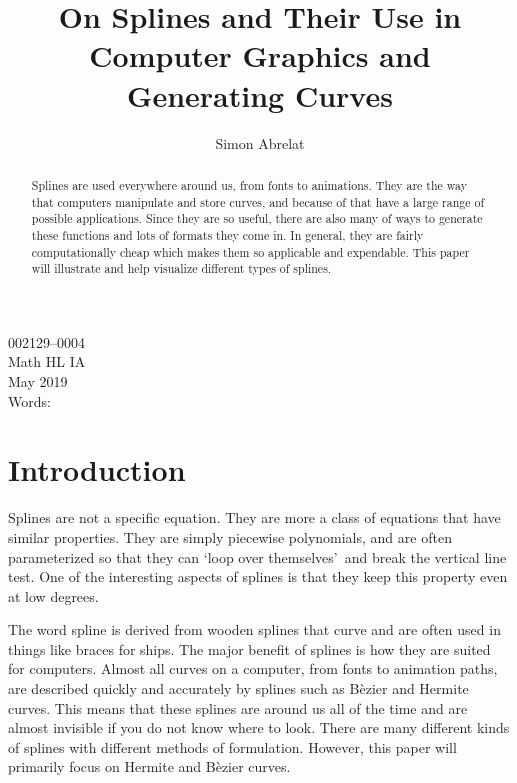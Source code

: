 \documentclass[12pt, letterpaper]{article}
\title{On Splines and Their Use in Computer Graphics and Generating Curves}
\author{Simon Abrelat}
\date{\vspace{-5ex}}
\newcommand{\sorta}[1]{\lq #1\rq \,}
\begin{document}
\large
{\fontsize{12}{14.4}
  {\singlespace{}
  \maketitle
  \begin{center}
  \vspace{4mm}
  002129--0004 \\
  \vspace{4mm}
  Math HL IA \\
  \vspace{4mm}
  May 2019 \\
  \vspace{4mm}
  Words: \\
  \end{center}
  }
}
\newpage

\begin{abstract}
Splines are used everywhere around us, from fonts to animations. They are the way that computers manipulate
and store curves, and because of that have a large range of possible applications. Since they are so useful, 
there are also
many of ways to generate these functions and lots of formats they come in. In general, they are fairly
computationally cheap which makes them so applicable and expendable. This paper will illustrate and help
visualize different types of splines.
\end{abstract}

\newpage
\tableofcontents
\newpage

\section{Introduction}
Splines are not a specific equation. They are more a class of equations that have similar properties. They 
are simply piecewise polynomials, and are often parameterized so that they can \sorta{loop over themselves}
and break the vertical line test. One of the interesting aspects of splines is that they keep this
property even at low degrees.


The word spline is derived from wooden splines that curve and are often
used in things like braces for ships. The major benefit of splines is how they are suited for computers.
Almost all curves on a computer, from fonts to animation paths, are described quickly and accurately by
splines such as B\`ezier and Hermite curves. This means that these splines are around us all of the time and 
are almost invisible if you do not know where to look. There are many different kinds of splines with
different methods of formulation. However, this paper will primarily focus on Hermite and B\`{e}zier curves.
\end{document}
